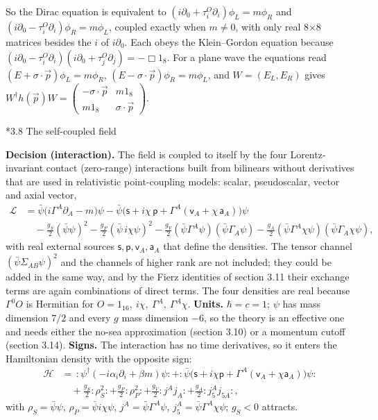 \documentclass[10pt,a4paper]{article}
\makeatletter
\renewcommand\subsection{\@startsection{subsection}{2}{\z@}{-3.25ex\@plus -1ex \@minus -.2ex}{1.5ex \@plus .2ex}{\normalfont\large\bfseries\raggedright}}
\makeatother
\begin{document}
So the Dirac equation is equivalent to $(i\partial_0+\tau^{O}_i\partial_i)\phi_L=m\phi_R$ and $(i\partial_0-\tau^{O}_i\partial_i)\phi_R=m\phi_L$, coupled exactly when $m\neq0$, with only real 8×8 matrices besides the $i$ of $i\partial_0$. Each obeys the Klein–Gordon equation because $(i\partial_0-\tau^{O}_i\partial_i)(i\partial_0+\tau^{O}_j\partial_j)=-\Box1_8$. For a plane wave the equations read $(E+\sigma\cdot\vec p)\phi_L=m\phi_R$, $(E-\sigma\cdot\vec p)\phi_R=m\phi_L$, and $W=(E_L,E_R)$ gives $W^\dagger h(\vec p)W=\left(\begin{smallmatrix}-\sigma\cdot\vec p&m1_8\\m1_8&\sigma\cdot\vec p\end{smallmatrix}\right)$.

\subsection*{3.8 The self-coupled field}
\textbf{Decision (interaction).} The field is coupled to itself by the four Lorentz-invariant contact (zero-range) interactions built from bilinears without derivatives that are used in relativistic point-coupling models: scalar, pseudoscalar, vector and axial vector,
\begin{align*}
\mathcal L&=\bar\psi\big(i\Gamma^A\partial_A-m\big)\psi-\bar\psi\big(\mathsf s+i\chi\,\mathsf p+\Gamma^A(\mathsf v_A+\chi\,\mathsf a_A)\big)\psi \\
&\quad-\frac{g_S}{2}(\bar\psi\psi)^2-\frac{g_P}{2}(\bar\psi\,i\chi\psi)^2-\frac{g_V}{2}(\bar\psi\Gamma^A\psi)(\bar\psi\Gamma_A\psi)-\frac{g_A}{2}(\bar\psi\Gamma^A\chi\psi)(\bar\psi\Gamma_A\chi\psi),
\end{align*}
with real external sources $\mathsf s,\mathsf p,\mathsf v_A,\mathsf a_A$ that define the densities. The tensor channel $(\bar\psi\Sigma_{AB}\psi)^2$ and the channels of higher rank are not included; they could be added in the same way, and by the Fierz identities of section 3.11 their exchange terms are again combinations of direct terms. The four densities are real because $\Gamma^0O$ is Hermitian for $O=1_{16},\ i\chi,\ \Gamma^A,\ \Gamma^A\chi$. \textbf{Units.} $\hbar=c=1$; $\psi$ has mass dimension $7/2$ and every $g$ mass dimension $-6$, so the theory is an effective one and needs either the no-sea approximation (section 3.10) or a momentum cutoff (section 3.14). \textbf{Signs.} The interaction has no time derivatives, so it enters the Hamiltonian density with the opposite sign:
\begin{align*}
\mathcal H&=\,:\psi^\dagger(-i\alpha_i\partial_i+\beta m)\psi:+:\bar\psi\big(\mathsf s+i\chi\mathsf p+\Gamma^A(\mathsf v_A+\chi\mathsf a_A)\big)\psi: \\
&\quad+\frac{g_S}2:\rho_S^2:+\frac{g_P}2:\rho_P^2:+\frac{g_V}2:j^Aj_A:+\frac{g_A}2:j_5^Aj_{5A}:,
\end{align*}
with $\rho_S=\bar\psi\psi$, $\rho_P=\bar\psi i\chi\psi$, $j^A=\bar\psi\Gamma^A\psi$, $j_5^A=\bar\psi\Gamma^A\chi\psi$; $g_S<0$ attracts.
\end{document}
